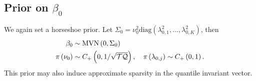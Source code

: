 \subsection{Prior on $\beta_0$}
%
We again set a horseshoe prior. Let $\Sigma_0 = \nu^2_0\text{diag}(\lambda^2_{0,1},\dotsc,\lambda^2_{0,K})$, then
%
\begin{equation} \label{eq:prior_level}
\begin{split}
    \beta_0 & \sim \mathrm{MVN}\left(0,\Sigma_0\right) \\
    \pi\left(\nu_0\right) & \sim C_{+}\left(0,1/\sqrt{\mathcal{T}\mathcal{Q}}\right),\quad \pi\left(\lambda_{0,j}\right) \sim C_{+}\left(0,1\right). 
\end{split}
\end{equation}
%
This prior may also induce approximate sparsity in the quantile invariant vector.
%

